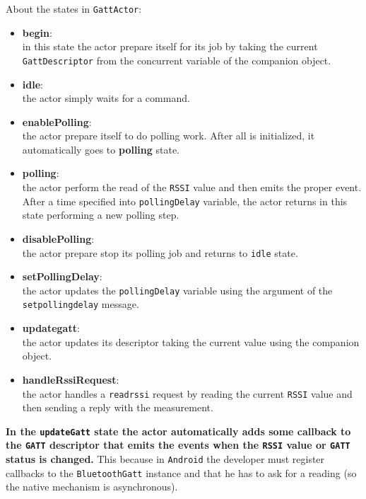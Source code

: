 About the states in \texttt{GattActor}:
\begin{itemize}
	\item \textbf{begin}:\\
	in this state the actor prepare itself for its job by taking the current \texttt{GattDescriptor} from the concurrent variable of the  companion object.
	
	\item \textbf{idle}:\\
	the actor simply waits for a command.
	
	\item \textbf{enablePolling}:\\
	the actor prepare itself to do polling work. After all is initialized, it automatically goes to \textbf{polling} state.
	
	\item \textbf{polling}:\\
	the actor perform the read of the \texttt{RSSI} value and then emits the proper event. After a time specified into \texttt{pollingDelay} variable, the actor returns in this state performing a new polling step.
	
	\item \textbf{disablePolling}:\\
	the actor prepare stop its polling job and returns to \texttt{idle} state.
	
	\item \textbf{setPollingDelay}:\\
	the actor updates the \texttt{pollingDelay} variable using the argument of the \texttt{setpollingdelay} message.
	
	\item \textbf{updategatt}:\\
	the actor updates its descriptor taking the current value using the companion object.
	
	\item \textbf{handleRssiRequest}:\\
	the actor handles a \texttt{readrssi} request by reading the current \texttt{RSSI} value and then sending a reply with the measurement.
	
\end{itemize}

\textbf{In the \texttt{updateGatt} state the actor automatically adds some callback to the \texttt{GATT} descriptor that emits the events when the \texttt{RSSI} value or \texttt{GATT} status is changed.} This because in \texttt{Android} the developer must register callbacks to the \texttt{BluetoothGatt} instance and that he has to ask for a reading (so the native mechanism is asynchronous).

